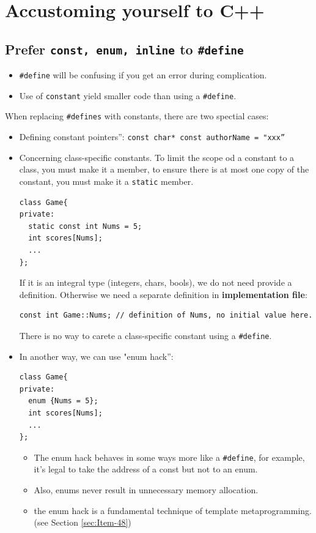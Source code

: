 \newpage
\section{Accustoming yourself to C++}

\subsection{Prefer \texttt{const, enum, inline} to \texttt{\#define}}
\label{sec:Item-2}
\begin{itemize}
\item \texttt{\#define} will be confusing if you get an error during
  complication.
\item Use of \texttt{constant} yield smaller code than using a
  \texttt{\#define}.
\end{itemize}

When replacing \texttt{\#defines} with constants, there are two
spectial cases:
\begin{itemize}
\item Defining constant pointers'': \texttt{const char* const
    authorName = "xxx''}
\item Concerning class-specific constants. To limit the scope od a
  constant to a class, you must make it a member, to ensure there is
  at most one copy of the constant, you must make it a \texttt{static}
  member.
\begin{verbatim}
class Game{
private:
  static const int Nums = 5;
  int scores[Nums];
  ...
};
\end{verbatim}
  If it is an integral type (integers, chars, bools), we do not need
  provide a definition. Otherwise we need a separate definition in
  \textbf{implementation file}:
\begin{verbatim}
const int Game::Nums; // definition of Nums, no initial value here.
\end{verbatim}
  There is no way to carete a class-specific constant using a
  \texttt{\#define}.

 
\item  In another way, we can use "enum hack'':
  \begin{verbatim}
class Game{
private:
  enum {Nums = 5};
  int scores[Nums];
  ...
};
\end{verbatim}
  \begin{itemize}
  \item The enum hack behaves in some ways more like a \texttt{\#define},
  for example, it's legal to take the address of a const but not to an
  enum. 
\item Also, enums never result in unnecessary memory
  allocation. 
\item the enum hack is a fundamental technique of template
  metaprogramming. (see Section \ref{sec:Item-48})
  \end{itemize}
\end{itemize}

